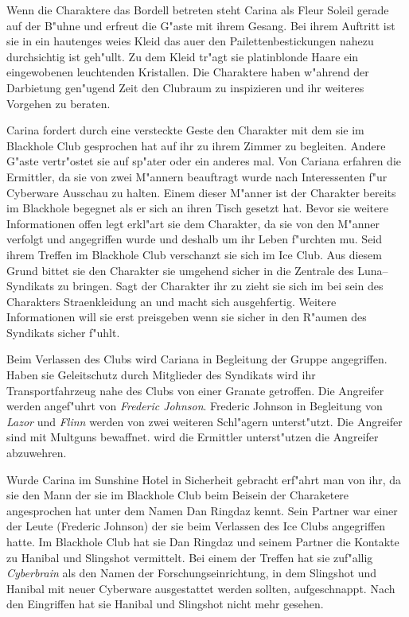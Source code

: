 Wenn die Charaktere das Bordell betreten steht Carina als Fleur Soleil gerade auf der B"uhne und erfreut die G"aste mit ihrem Gesang. Bei ihrem Auftritt ist sie in ein hautenges wei\3es Kleid das au\3er den Pailettenbestickungen nahezu durchsichtig ist geh"ullt. Zu dem Kleid tr"agt sie platinblonde Haare ein eingewobenen leuchtenden Kristallen. Die Charaktere haben w"ahrend der Darbietung gen"ugend Zeit den Clubraum zu inspizieren und ihr weiteres Vorgehen zu beraten.

Carina fordert durch eine versteckte Geste den Charakter mit dem sie im Blackhole Club gesprochen hat auf ihr zu ihrem Zimmer zu begleiten. Andere G"aste vertr"ostet sie auf sp"ater oder ein anderes mal. Von Cariana erfahren die Ermittler, da\3 sie von zwei M"annern beauftragt wurde nach Interessenten f"ur Cyberware Ausschau zu halten. Einem dieser M"anner ist der Charakter bereits im Blackhole begegnet als er sich an ihren Tisch gesetzt hat. Bevor sie weitere Informationen offen legt erkl"art sie dem Charakter, da\3 sie von den M"anner verfolgt und angegriffen wurde und deshalb um ihr Leben f"urchten mu\3. Seid ihrem Treffen im Blackhole Club verschanzt sie sich im Ice Club. Aus diesem Grund bittet sie den Charakter sie umgehend sicher in die Zentrale des Luna--Syndikats zu bringen. Sagt der Charakter ihr zu zieht sie sich im bei sein des Charakters Stra\3enkleidung an und macht sich ausgehfertig. Weitere Informationen will sie erst preisgeben wenn sie sicher in den R"aumen des Syndikats sicher f"uhlt.

Beim Verlassen des Clubs wird Cariana in Begleitung der Gruppe angegriffen. Haben sie Geleitschutz durch Mitglieder des Syndikats wird ihr Transportfahrzeug nahe des Clubs von einer Granate getroffen. Die Angreifer werden angef"uhrt von \emph{Frederic Johnson}. Frederic Johnson in Begleitung von \emph{Lazor} und \emph{Flinn} werden von zwei weiteren Schl"agern unterst"utzt. Die Angreifer sind mit Multguns bewaffnet. \xl{} wird die Ermittler unterst"utzen die Angreifer abzuwehren.

Wurde Carina im Sunshine Hotel in Sicherheit gebracht erf"ahrt man von ihr, da\3 sie den Mann der sie im Blackhole Club beim Beisein der Charaketere angesprochen hat unter dem Namen Dan Ringdaz kennt. Sein Partner war einer der Leute (Frederic Johnson) der sie beim Verlassen des Ice Clubs angegriffen hatte. Im Blackhole Club hat sie Dan Ringdaz und seinem Partner die Kontakte zu Hanibal und Slingshot vermittelt. Bei einem der Treffen hat sie zuf"allig \emph{Cyberbrain} als den Namen der Forschungseinrichtung, in dem Slingshot und Hanibal mit neuer Cyberware ausgestattet werden sollten, aufgeschnappt. Nach den Eingriffen hat sie Hanibal und Slingshot nicht mehr gesehen.

